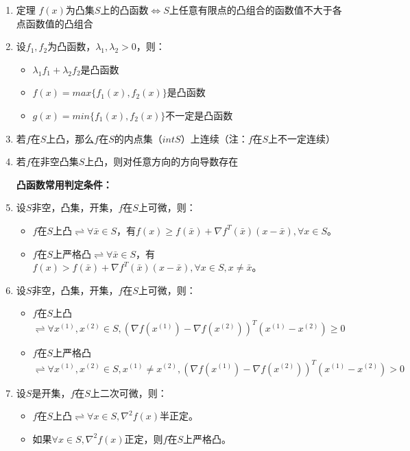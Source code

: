 \documentclass{book}
\begin{document}
\begin{enumerate}
    \item 定理 $f(x)$为凸集$S$上的凸函数$\Leftrightarrow S$上任意有限点的凸组合的函数值不大于各点函数值的凸组合
    \item 设$f_1,f_2$为凸函数，$\lambda_1,\lambda_2>0$，则：
        \begin{itemize}
            \item $\lambda_1f_1+\lambda_2f_2$是凸函数
            \item $f(x)=max\{f_1(x),f_2(x)\}$是凸函数
            \item $g(x)=min\{f_1(x),f_2(x)\}$不一定是凸函数
        \end{itemize}
    \item 若$f$在$S$上凸，那么$f$在$S$的内点集（$intS$）上连续（注：$f$在$S$上不一定连续）
    \item 若$f$在非空凸集$S$上凸，则对任意方向的方向导数存在

    \textbf{凸函数常用判定条件：}
    \item 设$S$非空，凸集，开集，$f$在$S$上可微，则：
        \begin{itemize}
            \item $f$在$S$上凸$\rightleftharpoons \forall \bar{x}\in S$，有$f(x)\ge f(\bar{x})+\nabla f^T(\bar{x})(x-\bar{x}), \forall x\in S$。
            \item $f$在$S$上严格凸$\rightleftharpoons \forall \bar{x}\in S$，有$f(x)> f(\bar{x})+\nabla f^T(\bar{x})(x-\bar{x}), \forall x\in S,x\ne\bar{x}$。
        \end{itemize}
    \item 设$S$非空，凸集，开集，$f$在$S$上可微，则：
        \begin{itemize}
            \item $f$在$S$上凸$\rightleftharpoons \forall x^{(1)},x^{(2)}\in S,(\nabla f(x^{(1)})-\nabla f(x^{(2)}))^T(x^{(1)}-x^{(2)})\ge 0$
            \item $f$在$S$上严格凸$\rightleftharpoons \forall x^{(1)},x^{(2)}\in S, x^{(1)}\ne x^{(2)},(\nabla f(x^{(1)})-\nabla f(x^{(2)}))^T(x^{(1)}-x^{(2)})> 0$
        \end{itemize}
    \item 设$S$是开集，$f$在$S$上二次可微，则：
        \begin{itemize}
            \item $f$在$S$上凸$\rightleftharpoons \forall x\in S, \nabla^2f(x)$半正定。
            \item 如果$\forall x \in S, \nabla^2f(x)$正定，则$f$在$S$上严格凸。
        \end{itemize}
\end{enumerate}
\end{document}
